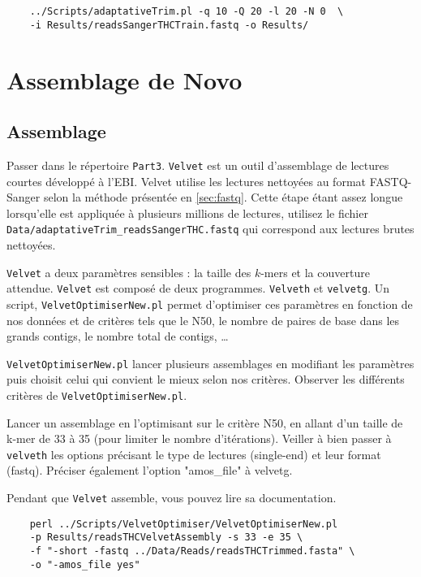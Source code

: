 \documentclass[a4paper,12pt]{article}
\begin{document}
\begin{lstlisting}	
	../Scripts/adaptativeTrim.pl -q 10 -Q 20 -l 20 -N 0  \
	-i Results/readsSangerTHCTrain.fastq -o Results/
\end{lstlisting}


\section{Assemblage de Novo}
\label{sec:assd}
\subsection{Assemblage}
Passer dans le répertoire \verb=Part3=. \verb=Velvet= est un outil d'assemblage de lectures courtes développé à l'EBI. Velvet utilise les lectures nettoyées au format FASTQ-Sanger selon la méthode présentée en \ref{sec:fastq}. Cette étape étant assez longue lorsqu'elle est appliquée à plusieurs millions de lectures, utilisez le fichier \verb=Data/adaptativeTrim_readsSangerTHC.fastq= qui correspond aux lectures brutes nettoyées.

\verb=Velvet= a deux paramètres sensibles : la taille des $k$-mers et la couverture attendue. \verb=Velvet= est composé de deux programmes. \verb=Velveth= et \verb=velvetg=.
Un script, \verb=VelvetOptimiserNew.pl= permet d'optimiser ces paramètres en fonction de nos données et de critères tels que le N50, le nombre de paires de base dans les grands contigs, le nombre total de contigs, \ldots

\verb=VelvetOptimiserNew.pl= lancer plusieurs assemblages en modifiant les paramètres puis choisit celui qui convient le mieux selon nos critères.
Observer les différents critères de \verb=VelvetOptimiserNew.pl=.

Lancer un assemblage en l'optimisant sur le critère N50, en allant d'un taille de k-mer de 33 à 35 (pour limiter le nombre d'itérations). Veiller à bien passer à \verb=velveth= les options précisant le type de lectures (single-end) et leur format (fastq). Préciser également l'option "amos\_file" à velvetg.

Pendant que \verb=Velvet= assemble, vous pouvez lire sa documentation.


\begin{lstlisting}	
	perl ../Scripts/VelvetOptimiser/VelvetOptimiserNew.pl 
	-p Results/readsTHCVelvetAssembly -s 33 -e 35 \
	-f "-short -fastq ../Data/Reads/readsTHCTrimmed.fasta" \
	-o "-amos_file yes"
\end{lstlisting}	
\end{document}
